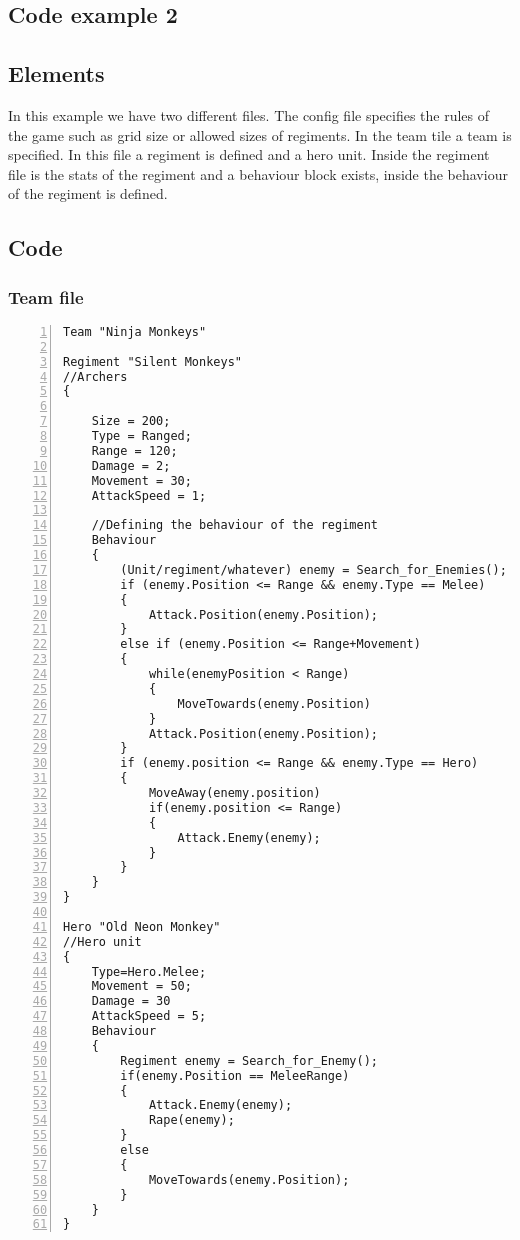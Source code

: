	\subsection{Code example 2}
			\subsection{Elements}
				In this example we have two different files. The config file specifies the rules of the game
				such as grid size or allowed sizes of regiments. In the team tile a team is specified. In this file
				a regiment is defined and a hero unit. Inside the regiment file is the stats of the regiment and
				a behaviour block exists, inside the behaviour of the regiment is defined.
			\subsection{Code}
				\subsubsection{Team file}
					\begin{lstlisting}[basicstyle=\small\sffamily,
					keywords={break,case,const,continue,default,else,enum,
					for,if,return,switch,while,do,long,void,int,float,double,
					char,struct,typedef,include,size\_t},
					keywordstyle={\color{blue}},
					comment={[l]{//}}, morecomment={[s]{/*}{*/}}, commentstyle=\itshape,
					columns={[l]flexible}, numbers=left, numberstyle=\tiny,
					frameround=fftt, frame=shadowbox, captionpos=b,
					caption={Team file of code example 3},
					label=LST:code31]
Team "Ninja Monkeys"

Regiment "Silent Monkeys"
//Archers
{
	
	Size = 200;
	Type = Ranged;
	Range = 120;
	Damage = 2;
	Movement = 30;
	AttackSpeed = 1;
	
	//Defining the behaviour of the regiment
	Behaviour
	{
		(Unit/regiment/whatever) enemy = Search_for_Enemies();
		if (enemy.Position <= Range && enemy.Type == Melee)
		{
			Attack.Position(enemy.Position);
		}
		else if (enemy.Position <= Range+Movement)
		{
			while(enemyPosition < Range)
			{
				MoveTowards(enemy.Position)
			}
			Attack.Position(enemy.Position);
		}
		if (enemy.position <= Range && enemy.Type == Hero)
		{
			MoveAway(enemy.position)
			if(enemy.position <= Range)
			{
				Attack.Enemy(enemy);
			}
		}
	}
}

Hero "Old Neon Monkey"
//Hero unit
{
	Type=Hero.Melee;
	Movement = 50;
	Damage = 30
	AttackSpeed = 5;
	Behaviour
	{
		Regiment enemy = Search_for_Enemy();
		if(enemy.Position == MeleeRange)
		{
			Attack.Enemy(enemy);
			Rape(enemy);
		}
		else
		{
			MoveTowards(enemy.Position);
		}
	}
}
					\end{lstlisting}
